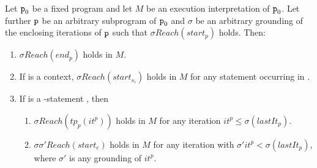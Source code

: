 \begin{lemma}\label{lemma:reach}
	Let $\texttt{p}_0$ be a fixed program and let $M$ be an execution interpretation of $\texttt{p}_0$. Let further $\texttt{p}$ be an arbitrary subprogram of $\texttt{p}_0$ and $\sigma$ be an arbitrary grounding of the enclosing iterations of $\texttt{p}$ such that $\sigma\mathit{Reach}(\mathit{start}_p)$ holds. Then:
	\begin{enumerate}
		\item \label{lemma:reach1} $\sigma\mathit{Reach}(\mathit{end}_p)$ holds in $M$.
		\item \label{lemma:reach-context} 
		If  is a context, $\sigma\mathit{Reach}(\mathit{start}_{s_i})$ holds in $M$ for any statement  occurring in .
		\item \label{lemma:reach2} If  is a \whileStatement-statement , then
		\begin{enumerate}[label={\alph*.}]
			\item $\sigma \mathit{Reach}(tp_p(it^p))$ holds in $M$ for any iteration $it^p \leq \sigma(\mathit{lastIt}_p)$.\label{lemma:reach2a}
			\item $\sigma\sigma' \mathit{Reach}(start_c)$ holds in $M$ for any iteration with $\sigma'it^p<\sigma(\mathit{lastIt}_p)$, where $\sigma'$ is any grounding of $it^p$.\label{lemma:reach2b}
		\end{enumerate}
	\end{enumerate}
\end{lemma}
